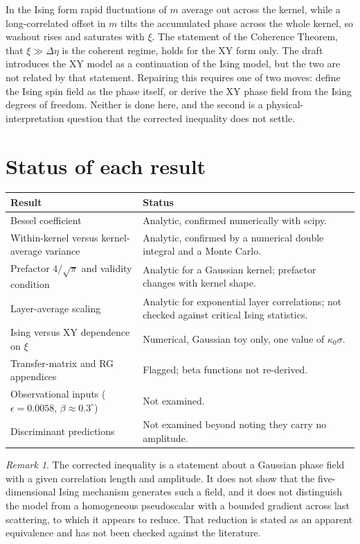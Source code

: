 \documentclass[11pt]{article}
\theoremstyle{remark}
\newtheorem{remark}{Remark}
\newcommand{\Wrec}{\Delta\eta}
\begin{document}
In the Ising form rapid fluctuations of $m$ average out across the kernel, while a long-correlated offset in $m$ tilts the accumulated phase across the whole kernel, so washout rises and saturates with $\xi$. The statement of the Coherence Theorem, that $\xi\gg\Wrec$ is the coherent regime, holds for the XY form only. The draft introduces the XY model as a continuation of the Ising model, but the two are not related by that statement. Repairing this requires one of two moves: define the Ising spin field as the phase itself, or derive the XY phase field from the Ising degrees of freedom. Neither is done here, and the second is a physical-interpretation question that the corrected inequality does not settle.

\section{Status of each result}

\begin{table}[h]
\centering\small
\begin{tabular}{p{6.2cm}p{7.6cm}}
\toprule
Result & Status \\
\midrule
Bessel coefficient & Analytic, confirmed numerically with scipy. \\
Within-kernel versus kernel-average variance & Analytic, confirmed by a numerical double integral and a Monte Carlo. \\
Prefactor $4/\sqrt\pi$ and validity condition & Analytic for a Gaussian kernel; prefactor changes with kernel shape. \\
Layer-average scaling & Analytic for exponential layer correlations; not checked against critical Ising statistics. \\
Ising versus XY dependence on $\xi$ & Numerical, Gaussian toy only, one value of $\kappa_0\sigma$. \\
Transfer-matrix and RG appendices & Flagged; beta functions not re-derived. \\
Observational inputs ($\epsilon=0.0058$, $\beta\approx0.3^\circ$) & Not examined. \\
Discriminant predictions & Not examined beyond noting they carry no amplitude. \\
\bottomrule
\end{tabular}
\end{table}

\begin{remark}
The corrected inequality is a statement about a Gaussian phase field with a given correlation length and amplitude. It does not show that the five-dimensional Ising mechanism generates such a field, and it does not distinguish the model from a homogeneous pseudoscalar with a bounded gradient across last scattering, to which it appears to reduce. That reduction is stated as an apparent equivalence and has not been checked against the literature.
\end{remark}
\end{document}
